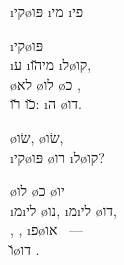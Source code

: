 \textheader%
{\i{קי}\o{פּו}}
{ \i{מי} \i{פי}}
{}
{}
{}
{}
{}

\begin{twocol}
\begin{stanza}
  \i{קי}\o{פּו}\\
\i{ע} \i{מי}\u{הו} \i{ל}\o{קו},\\
 \o{לא}  \o{לו} \o{כ} ,\\
\u{כו} \u{רו}: \i{ה} \o{דו}.
\end{stanza}

\begin{stanza}
 \o{שׂו},  \o{שׂו},\\
\i{קי}\o{פּו} \o{רו} \i{ל}\o{קו}?
\end{stanza}

\begin{stanza}
  \o{לו} \o{כ} \o{יו}\\
\i{מ}\i{לי} \o{נו}{\gnuvah}, \i{מ}\i{לי} \o{דו},\\
, , \i{פ}\o{או} ~—\\
\u{ו}\o{דו} .
\end{stanza}

\end{twocol}
